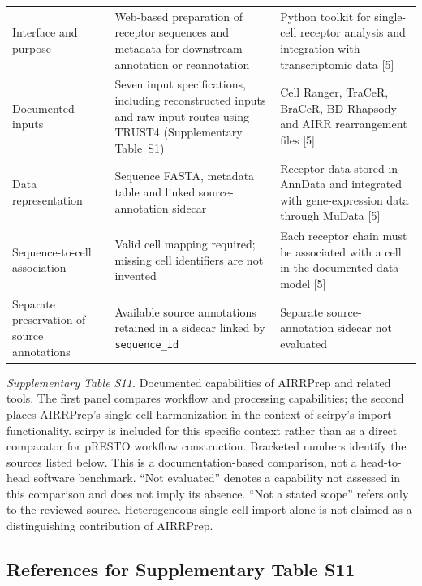 \documentclass[11pt]{article}
\begin{document}
\begin{landscape}
\begin{longtable}{p{}p{}p{}}
Interface and purpose &
Web-based preparation of receptor sequences and metadata for downstream annotation or reannotation &
Python toolkit for single-cell receptor analysis and integration with transcriptomic data [5] \\

Documented inputs &
Seven input specifications, including reconstructed inputs and raw-input routes using TRUST4 (Supplementary Table~S1) &
Cell Ranger, TraCeR, BraCeR, BD Rhapsody and AIRR rearrangement files [5] \\

Data representation &
Sequence FASTA, metadata table and linked source-annotation sidecar &
Receptor data stored in AnnData and integrated with gene-expression data through MuData [5] \\

Sequence-to-cell association &
Valid cell mapping required; missing cell identifiers are not invented &
Each receptor chain must be associated with a cell in the documented data model [5] \\

Separate preservation of source annotations &
Available source annotations retained in a sidecar linked by \texttt{sequence\_id} &
Separate source-annotation sidecar not evaluated \\

\end{longtable}
\normalsize

{\small\textit{Supplementary Table S11.}
Documented capabilities of AIRRPrep and related tools.
The first panel compares workflow and processing capabilities;
the second places AIRRPrep's single-cell harmonization in the
context of scirpy's import functionality. scirpy is included for
this specific context rather than as a direct comparator for
pRESTO workflow construction. Bracketed numbers identify the
sources listed below. This is a documentation-based comparison,
not a head-to-head software benchmark. ``Not evaluated'' denotes
a capability not assessed in this comparison and does not imply
its absence. ``Not a stated scope'' refers only to the reviewed
source. Heterogeneous single-cell import alone is not claimed
as a distinguishing contribution of AIRRPrep.\par}
\vspace{1em}
\subsection*{References for Supplementary Table S11}


\end{landscape}
\end{document}
